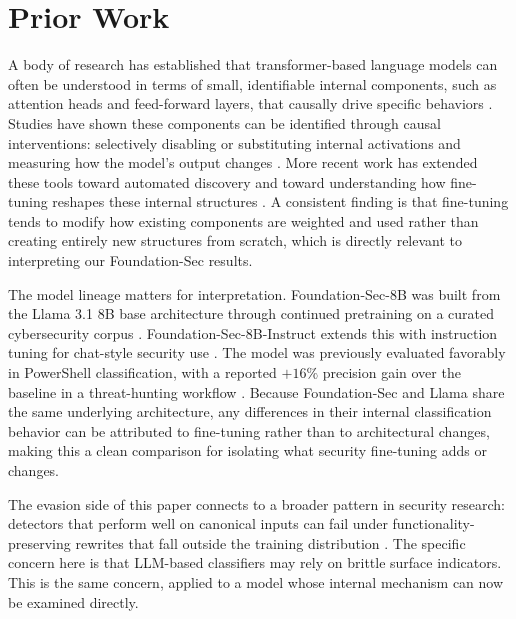 \documentclass{article}
\begin{document}
\section{Prior Work}
A body of research has established that transformer-based language models can often be understood in terms of small, identifiable internal components, such as attention heads and feed-forward layers, that causally drive specific behaviors \citep{cammarata2020thread,elhage2021mathematical}. Studies have shown these components can be identified through causal interventions: selectively disabling or substituting internal activations and measuring how the model's output changes \citep{wang2023interpretability,conmy2023automated}. More recent work has extended these tools toward automated discovery and toward understanding how fine-tuning reshapes these internal structures \citep{ameisen2025attributiongraphs,wang2025finetuningcircuits}. A consistent finding is that fine-tuning tends to modify how existing components are weighted and used rather than creating entirely new structures from scratch, which is directly relevant to interpreting our Foundation-Sec results.

The model lineage matters for interpretation. Foundation-Sec-8B was built from the Llama 3.1 8B base architecture through continued pretraining on a curated cybersecurity corpus \citep{kassianik2025foundationsecbase}. Foundation-Sec-8B-Instruct extends this with instruction tuning for chat-style security use \citep{weerawardhena2025foundationsecinstruct}. The model was previously evaluated favorably in PowerShell classification, with a reported \(+16\%\) precision gain over the baseline in a threat-hunting workflow \citep{fetterman2025foundationsecpowershell}. Because Foundation-Sec and Llama share the same underlying architecture, any differences in their internal classification behavior can be attributed to fine-tuning rather than to architectural changes, making this a clean comparison for isolating what security fine-tuning adds or changes.

The evasion side of this paper connects to a broader pattern in security research: detectors that perform well on canonical inputs can fail under functionality-preserving rewrites that fall outside the training distribution \citep{lucas2023adversarial,mukherjee2023evading}. The specific concern here is that LLM-based classifiers may rely on brittle surface indicators. This is the same concern, applied to a model whose internal mechanism can now be examined directly.
\end{document}
